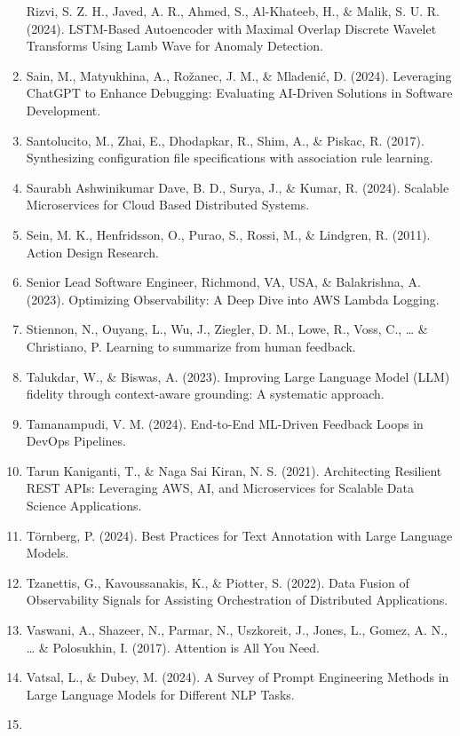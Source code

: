 \documentclass[
  a4paper,
  12pt,
  oneside,
  open=any,
  BCOR=12mm,
  DIV=14,
  parskip=half*,
  headsepline,
  footsepline,
  pointlessnumbers,
  liststotoc,
  numbers=noenddot,
  listof=totoc]{scrartcl}
\begin{document}
\begin{enumerate}
  Rizvi, S. Z. H., Javed, A. R., Ahmed, S., Al-Khateeb, H., \& Malik, S.
  U. R. (2024). LSTM-Based Autoencoder with Maximal Overlap Discrete
  Wavelet Transforms Using Lamb Wave for Anomaly Detection.
\item
  Sain, M., Matyukhina, A., Rožanec, J. M., \& Mladenić, D. (2024).
  Leveraging ChatGPT to Enhance Debugging: Evaluating AI-Driven
  Solutions in Software Development.
\item
  Santolucito, M., Zhai, E., Dhodapkar, R., Shim, A., \& Piskac, R.
  (2017). Synthesizing configuration file specifications with
  association rule learning.
\item
  Saurabh Ashwinikumar Dave, B. D., Surya, J., \& Kumar, R. (2024).
  Scalable Microservices for Cloud Based Distributed Systems.
\item
  Sein, M. K., Henfridsson, O., Purao, S., Rossi, M., \& Lindgren, R.
  (2011). Action Design Research.
\item
  Senior Lead Software Engineer, Richmond, VA, USA, \& Balakrishna, A.
  (2023). Optimizing Observability: A Deep Dive into AWS Lambda Logging.
\item
  Stiennon, N., Ouyang, L., Wu, J., Ziegler, D. M., Lowe, R., Voss, C.,
  \ldots{} \& Christiano, P. Learning to summarize from human feedback.
\item
  Talukdar, W., \& Biswas, A. (2023). Improving Large Language Model
  (LLM) fidelity through context-aware grounding: A systematic approach.
\item
  Tamanampudi, V. M. (2024). End-to-End ML-Driven Feedback Loops in
  DevOps Pipelines.
\item
  Tarun Kaniganti, T., \& Naga Sai Kiran, N. S. (2021). Architecting
  Resilient REST APIs: Leveraging AWS, AI, and Microservices for
  Scalable Data Science Applications.
\item
  Törnberg, P. (2024). Best Practices for Text Annotation with Large
  Language Models.
\item
  Tzanettis, G., Kavoussanakis, K., \& Piotter, S. (2022). Data Fusion
  of Observability Signals for Assisting Orchestration of Distributed
  Applications.
\item
  Vaswani, A., Shazeer, N., Parmar, N., Uszkoreit, J., Jones, L., Gomez,
  A. N., \ldots{} \& Polosukhin, I. (2017). Attention is All You Need.
\item
  Vatsal, L., \& Dubey, M. (2024). A Survey of Prompt Engineering
  Methods in Large Language Models for Different NLP Tasks.
\item

\end{enumerate}
\end{document}
